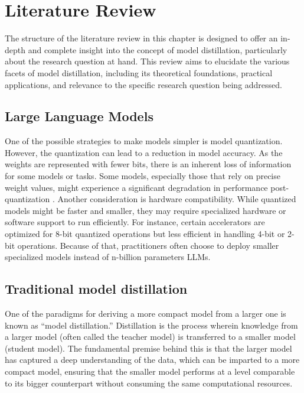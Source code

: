 \chapter{Literature Review}
\label{chap:lr}

The structure of the literature review in this chapter is designed to offer an in-depth and complete insight into the concept of model distillation, particularly about the research question at hand. This review aims to elucidate the various facets of model distillation, including its theoretical foundations, practical applications, and relevance to the specific research question being addressed.

\section{Large Language Models}

One of the possible strategies to make models simpler is model quantization. However, the quantization can lead to a reduction in model accuracy. As the weights are represented with fewer bits, there is an inherent loss of information for some models or tasks. Some models, especially those that rely on precise weight values, might experience a significant degradation in performance post-quantization \cite{compressingllm}. Another consideration is hardware compatibility. While quantized models might be faster and smaller, they may require specialized hardware or software support to run efficiently. For instance, certain accelerators are optimized for 8-bit quantized operations but less efficient in handling 4-bit or 2-bit operations. Because of that, practitioners often choose to deploy smaller specialized models instead of n-billion parameters LLMs.

\section{Traditional model distillation}

One of the paradigms for deriving a more compact model from a larger one is known as ``model distillation.'' Distillation is the process wherein knowledge from a larger model (often called the teacher model) is transferred to a smaller model (student model). The fundamental premise behind this is that the larger model has captured a deep understanding of the data, which can be imparted to a more compact model, ensuring that the smaller model performs at a level comparable to its bigger counterpart without consuming the same computational resources.

